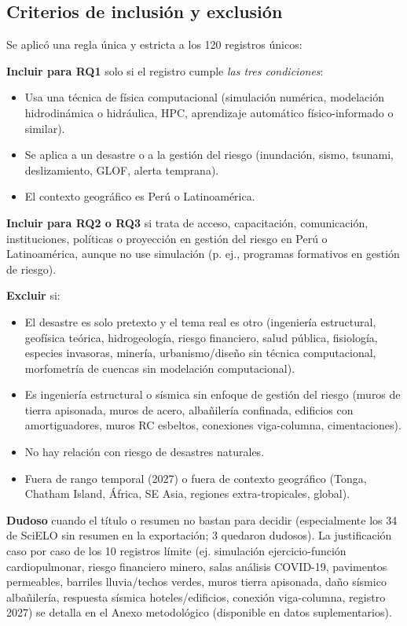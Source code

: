 \documentclass[12pt,a4paper]{article}
\begin{document}
\subsection{Criterios de inclusión y exclusión}
Se aplicó una regla única y estricta a los 120 registros únicos:

\textbf{Incluir para RQ1} solo si el registro cumple \textit{las tres condiciones}:
\begin{itemize}
  \item Usa una técnica de física computacional (simulación numérica, modelación hidrodinámica o hidráulica, HPC, aprendizaje automático físico-informado o similar).
  \item Se aplica a un desastre o a la gestión del riesgo (inundación, sismo, tsunami, deslizamiento, GLOF, alerta temprana).
  \item El contexto geográfico es Perú o Latinoamérica.
\end{itemize}

\textbf{Incluir para RQ2 o RQ3} si trata de acceso, capacitación, comunicación, instituciones, políticas o proyección en gestión del riesgo en Perú o Latinoamérica, aunque no use simulación (p. ej., programas formativos en gestión de riesgo).

\textbf{Excluir} si:
\begin{itemize}
  \item El desastre es solo pretexto y el tema real es otro (ingeniería estructural, geofísica teórica, hidrogeología, riesgo financiero, salud pública, fisiología, especies invasoras, minería, urbanismo/diseño sin técnica computacional, morfometría de cuencas sin modelación computacional).
  \item Es ingeniería estructural o sísmica sin enfoque de gestión del riesgo (muros de tierra apisonada, muros de acero, albañilería confinada, edificios con amortiguadores, muros RC esbeltos, conexiones viga-columna, cimentaciones).
  \item No hay relación con riesgo de desastres naturales.
  \item Fuera de rango temporal (2027) o fuera de contexto geográfico (Tonga, Chatham Island, África, SE Asia, regiones extra-tropicales, global).
\end{itemize}

\textbf{Dudoso} cuando el título o resumen no bastan para decidir (especialmente los 34 de SciELO sin resumen en la exportación; 3 quedaron dudosos). La justificación caso por caso de los 10 registros límite (ej. simulación ejercicio-función cardiopulmonar, riesgo financiero minero, salas análisis COVID-19, pavimentos permeables, barriles lluvia/techos verdes, muros tierra apisonada, daño sísmico albañilería, respuesta sísmica hoteles/edificios, conexión viga-columna, registro 2027) se detalla en el Anexo metodológico (disponible en datos suplementarios).
\end{document}
